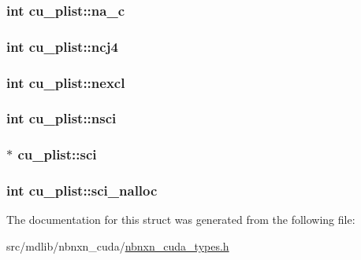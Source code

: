 \hypertarget{structcu__plist_a0d8047be1294a941c932216457eb6467}{
\subsubsection[{na\-\_\-c}]{\setlength{\rightskip}{0pt plus 5cm}int {\bf cu\-\_\-plist\-::na\-\_\-c}}}\label{structcu__plist_a0d8047be1294a941c932216457eb6467}
\hypertarget{structcu__plist_a561bbcce3f9536e7e795584996b8d4dc}{
\subsubsection[{ncj4}]{\setlength{\rightskip}{0pt plus 5cm}int {\bf cu\-\_\-plist\-::ncj4}}}\label{structcu__plist_a561bbcce3f9536e7e795584996b8d4dc}
\hypertarget{structcu__plist_ae2a1755fcfcd06a5da1acfde67673b65}{
\subsubsection[{nexcl}]{\setlength{\rightskip}{0pt plus 5cm}int {\bf cu\-\_\-plist\-::nexcl}}}\label{structcu__plist_ae2a1755fcfcd06a5da1acfde67673b65}
\hypertarget{structcu__plist_a9cd013d2e3cd82f6e4d93728ec2455e3}{
\subsubsection[{nsci}]{\setlength{\rightskip}{0pt plus 5cm}int {\bf cu\-\_\-plist\-::nsci}}}\label{structcu__plist_a9cd013d2e3cd82f6e4d93728ec2455e3}
\hypertarget{structcu__plist_ae3f14dcf2b650aa235f07322108fa2dd}{
\subsubsection[{sci}]{$\ast$ {\bf cu\-\_\-plist\-::sci}}}\label{structcu__plist_ae3f14dcf2b650aa235f07322108fa2dd}
\hypertarget{structcu__plist_a0037c494d380de4f2e54826e88a91229}{
\subsubsection[{sci\-\_\-nalloc}]{\setlength{\rightskip}{0pt plus 5cm}int {\bf cu\-\_\-plist\-::sci\-\_\-nalloc}}}\label{structcu__plist_a0037c494d380de4f2e54826e88a91229}


\-The documentation for this struct was generated from the following file\-:\begin{DoxyCompactItemize}
\item 
src/mdlib/nbnxn\-\_\-cuda/\hyperlink{nbnxn__cuda__types_8h}{nbnxn\-\_\-cuda\-\_\-types.\-h}\end{DoxyCompactItemize}

